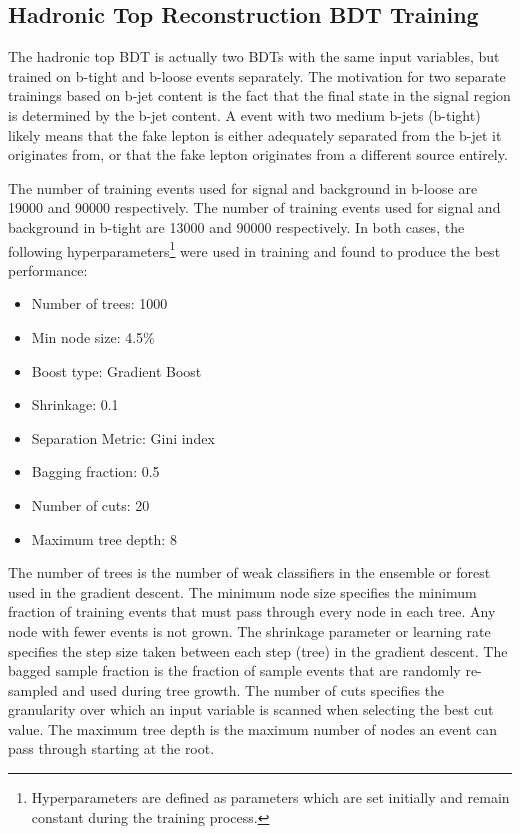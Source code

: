 \subsection{Hadronic Top Reconstruction BDT Training}
The hadronic top BDT is actually two BDTs with the same input variables, but trained on b-tight and b-loose events separately. The motivation for two separate trainings based on b-jet
content is the fact that the \ttbar final state in the signal region is determined by the b-jet content. A \ttbar event with two medium b-jets (b-tight) likely means that the fake lepton is either
adequately separated from the b-jet it originates from, or that the fake lepton originates from a different source entirely.

The number of training events used for signal and background in b-loose are 19000 and 90000 respectively.
The number of training events used for signal and background in b-tight are 13000 and 90000 respectively.
In both cases, the following hyperparameters\footnote{Hyperparameters are defined as parameters which are set initially and remain constant during the training process.}
were used in training and found to produce the best performance:

\begin{itemize}
\item Number of trees: 1000
\item Min node size: 4.5$\%$
\item Boost type: Gradient Boost
\item Shrinkage: 0.1
\item Separation Metric: Gini index
\item Bagging fraction: 0.5
\item Number of cuts: 20
\item Maximum tree depth: 8
\end{itemize}


\noindent The number of trees is the number of weak classifiers in the ensemble or forest used in the gradient descent. The minimum node size specifies the minimum fraction of training events that must pass
through every node in each tree. Any node with fewer events is not grown. The shrinkage parameter or learning rate specifies the step size taken between each step (tree) in the gradient descent.
The bagged sample fraction is the fraction of sample events that are randomly re-sampled and used during tree growth. The number of cuts specifies the granularity over which an input variable is scanned
when selecting the best cut value. The maximum tree depth is the maximum number of nodes an event can pass through starting at the root. 


